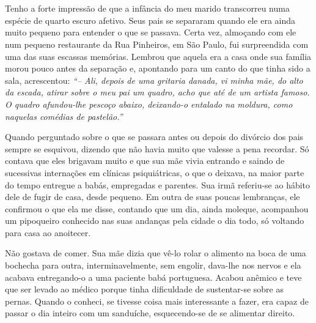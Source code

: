 \chapter{}
Tenho a forte impressão de que a infância do meu marido transcorreu numa espécie de quarto escuro afetivo.
Seus pais se separaram quando ele era ainda muito pequeno para entender o que se passava.
Certa vez, almoçando com ele num pequeno restaurante da Rua Pinheiros, em São Paulo, fui surpreendida com uma das suas escassas memórias.
Lembrou que aquela era a casa onde sua família morou pouco antes da separação e, apontando para um canto do que tinha sido a sala, acrescentou: 
\textit{``-- Ali, depois de uma gritaria danada, vi minha mãe, do alto da escada, atirar sobre o meu pai um quadro, acho que até de um artista famoso.
O quadro afundou-lhe pescoço abaixo, deixando-o entalado na moldura, como naquelas comédias de pastelão.'' }

Quando perguntado sobre o que se passara antes ou depois do divórcio dos pais sempre se esquivou, dizendo que não havia muito que valesse a pena recordar.
Só contava que eles brigavam muito e que sua mãe vivia entrando e saindo de sucessivas internações em clínicas psiquiátricas, o que o deixava, na maior parte do tempo entregue a babás, empregadas e parentes.
Sua irmã referiu-se ao hábito dele de fugir de casa, desde pequeno.
Em outra de suas poucas lembranças, ele confirmou o que ela me disse, contando que um dia, ainda moleque, acompanhou um pipoqueiro conhecido nas suas andanças pela cidade o dia todo, só voltando para casa ao anoitecer.

Não gostava de comer.
Sua mãe dizia que vê-lo rolar o alimento na boca de uma bochecha para outra, interminavelmente, sem engolir, dava-lhe nos nervos e ela acabava entregando-o a uma paciente babá portuguesa.
Acabou anêmico e teve que ser levado ao médico porque tinha dificuldade de sustentar-se sobre as pernas.
Quando o conheci, se tivesse coisa mais interessante a fazer, era capaz de passar o dia inteiro com um sanduíche, esquecendo-se de se alimentar direito.

